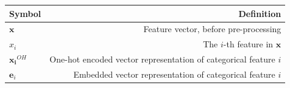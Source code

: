 \documentclass{mldsmsc}
\begin{document}
\begin{table}[ht]
    \begin{tabular}{|l|r|}
      \hline
        Symbol & Definition \\
      \hline
        $\mathbf{x}$& Feature vector, before pre-processing\\
        $x_i$& The $i$-th feature in $\mathbf{x}$\\
        $\mathbf{x_i}^{OH}$ & One-hot encoded vector representation of categorical feature $i$\\
        $\mathbf{e}_i$ & Embedded vector representation of categorical feature $i$ \\
    \hline
    \end{tabular}
\end{table}




\end{document}
